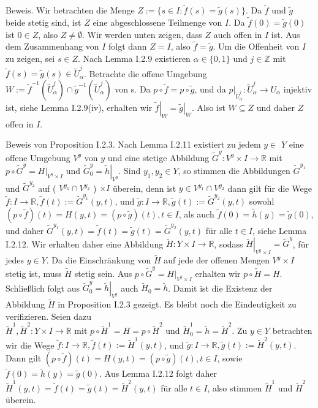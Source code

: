 \documentclass[10pt]{article}
\begin{document}
Beweis. Wir betrachten die Menge $Z:=\{s \in I: \tilde{f}(s)=\tilde{g}(s)\}$. Da $\tilde{f}$ und $\tilde{g}$ beide stetig sind, ist $Z$ eine abgeschlossene Teilmenge von $I$. Da $\tilde{f}(0)=\tilde{g}(0)$ ist $0 \in Z$, also $Z \neq \emptyset$. Wir werden unten zeigen, dass $Z$ auch offen in $I$ ist. Aus dem Zusammenhang von $I$ folgt dann $Z=I$, also $\tilde{f}=\tilde{g}$. Um die Offenheit von $I$ zu zeigen, sei $s \in Z$. Nach Lemma I.2.9 existieren $\alpha \in\{0,1\}$ und $j \in \mathbb{Z}$ mit $\tilde{f}(s)=\tilde{g}(s) \in \tilde{U}_{\alpha}^{j}$. Betrachte die offene Umgebung $W:=\tilde{f}^{-1}\left(\tilde{U}_{\alpha}^{j}\right) \cap \tilde{g}^{-1}\left(\tilde{U}_{\alpha}^{j}\right)$ von s. Da $p \circ \tilde{f}=p \circ \tilde{g}$, und da $\left.p\right|_{\tilde{U}_{\alpha}^{j}}: \tilde{U}_{\alpha}^{j} \rightarrow U_{\alpha}$ injektiv ist, siehe Lemma I.2.9(iv), erhalten wir $\left.\tilde{f}\right|_{W}=\left.\tilde{g}\right|_{W}$. Also ist $W \subseteq Z$ und daher $Z$ offen in $I$.

Beweis von Proposition I.2.3. Nach Lemma I.2.11 existiert zu jedem $y \in$ $Y$ eine offene Umgebung $V^{y}$ von $y$ und eine stetige Abbildung $\tilde{G}^{y}: V^{y} \times I \rightarrow \mathbb{R}$ mit $p \circ \tilde{G}^{y}=\left.H\right|_{V^{y} \times I}$ und $\tilde{G}_{0}^{y}=\left.\tilde{h}\right|_{V^{y}}$. Sind $y_{1}, y_{2} \in Y$, so stimmen die Abbildungen $\tilde{G}^{y_{1}}$ und $\tilde{G}^{y_{2}}$ auf ( $V^{y_{1}} \cap V^{y_{2}}$ ) $\times I$ überein, denn ist $y \in V^{y_{1}} \cap V^{y_{2}}$ dann gilt für die Wege $\tilde{f}: I \rightarrow \mathbb{R}, \tilde{f}(t):=\tilde{G}^{y_{1}}(y, t)$, und $\tilde{g}: I \rightarrow \mathbb{R}, \tilde{g}(t):=\tilde{G}^{y_{2}}(y, t)$ sowohl $(p \circ \tilde{f})(t)=H(y, t)=(p \circ \tilde{g})(t), t \in I$, als auch $\tilde{f}(0)=\tilde{h}(y)=\tilde{g}(0)$, und daher $\tilde{G}^{y_{1}}(y, t)=\tilde{f}(t)=\tilde{g}(t)=\tilde{G}^{y_{2}}(y, t)$ für alle $t \in I$, siehe Lemma I.2.12. Wir erhalten daher eine Abbildung $\tilde{H}: Y \times I \rightarrow \mathbb{R}$, sodass $\left.\tilde{H}\right|_{V^{y} \times I}=\tilde{G}^{y}$, für jedes $y \in Y$. Da die Einschränkung von $\tilde{H}$ auf jede der offenen Mengen $V^{y} \times I$ stetig ist, muss $\tilde{H}$ stetig sein. Aus $p \circ \tilde{G}^{y}=\left.H\right|_{V^{y} \times I}$ erhalten wir $p \circ \tilde{H}=H$. Schließlich folgt aus $\tilde{G}_{0}^{y}=\left.\tilde{h}\right|_{V^{y}}$ auch $\tilde{H}_{0}=\tilde{h}$. Damit ist die Existenz der Abbildung $\tilde{H}$ in Proposition I.2.3 gezeigt. Es bleibt noch die Eindeutigkeit zu verifizieren. Seien dazu\\
$\tilde{H}^{1}, \tilde{H}^{2}: Y \times I \rightarrow \mathbb{R}$ mit $p \circ \tilde{H}^{1}=H=p \circ \tilde{H}^{2}$ und $\tilde{H}_{0}^{1}=\tilde{h}=\tilde{H}^{2}$. Zu $y \in Y$ betrachten wir die Wege $\tilde{f}: I \rightarrow \mathbb{R}, \tilde{f}(t):=\tilde{H}^{1}(y, t)$, und $\tilde{g}: I \rightarrow \mathbb{R}, \tilde{g}(t):=\tilde{H}^{2}(y, t)$. Dann gilt $(p \circ \tilde{f})(t)=H(y, t)=(p \circ \tilde{g})(t), t \in I$, sowie $\tilde{f}(0)=\tilde{h}(y)=\tilde{g}(0)$. Aus Lemma I.2.12 folgt daher $\tilde{H}^{1}(y, t)=\tilde{f}(t)=\tilde{g}(t)=\tilde{H}^{2}(y, t)$ für alle $t \in I$, also stimmen $\tilde{H}^{1}$ und $\tilde{H}^{2}$ überein.
\end{document}

